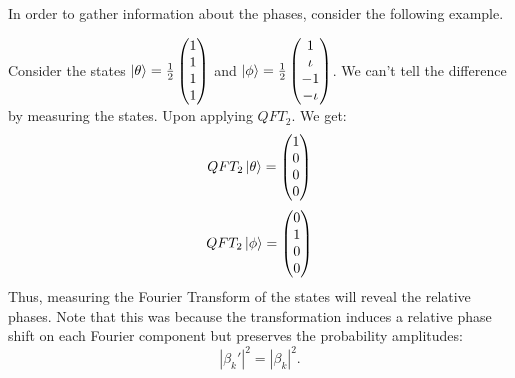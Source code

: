 In order to gather information about the phases, consider the following example.
\begin{example}
    Consider the states $\ket{\theta}=\frac{1}{2}\begin{pmatrix} 1 \\ 1 \\ 1 \\ 1 \end{pmatrix}$ and $\ket{\phi}=\frac{1}{2}\begin{pmatrix} 1 \\ \iota \\ -1 \\ -\iota \end{pmatrix}$. 
        We can't tell the difference by measuring the states.
        Upon applying $QFT_2$. We get:
        \[ QFT_2\ket{\theta}=\begin{pmatrix} 1 \\ 0 \\ 0 \\ 0 \end{pmatrix} \]
        \[ QFT_2\ket{\phi}=\begin{pmatrix} 0 \\ 1 \\ 0 \\ 0 \end{pmatrix} \]
        Thus, measuring the Fourier Transform of the states will reveal the relative phases. Note that this was because the transformation induces a relative phase shift on each Fourier component but preserves the probability amplitudes:
\[
|\beta_k'|^2 = |\beta_k|^2.
\]
\end{example}        



